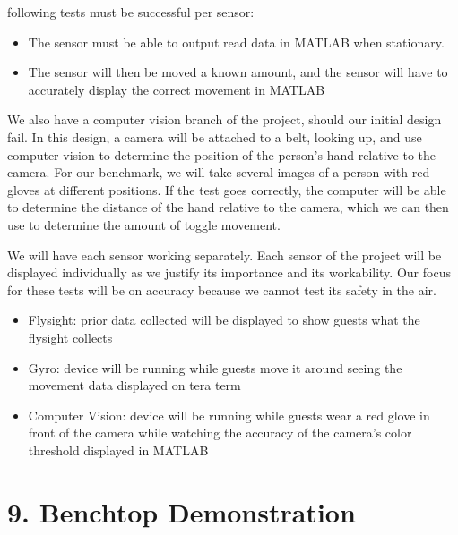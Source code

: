 \documentclass[10pt]{article}
\begin{document}
following tests must be successful per sensor:

\begin{itemize}

\item The sensor must be able to output read data in MATLAB when stationary.

\item The sensor will then be moved a known amount, and the sensor will have to accurately display the correct movement in MATLAB
\end{itemize}

We also have a computer vision branch of the project, should our initial design fail. In this design, a camera will be attached to a belt, looking up, and use computer vision to determine the position of the person’s hand relative to the camera. For our benchmark, we will take several images of a person with red gloves at different positions. If the test goes correctly, the computer will be able to determine the distance of the hand relative to the camera, which we can then use to determine the amount of toggle movement.



We will have each sensor working separately. Each sensor of the project will be displayed individually as we justify its importance and its workability. Our focus for these tests will be on accuracy because we cannot test its safety in the air.

\begin{itemize}

\item Flysight: prior data collected will be displayed to show guests what the flysight collects

\item Gyro: device will be running while guests move it around seeing the movement data displayed on tera term

\item Computer Vision: device will be running while guests wear a red glove in front of the camera while watching the accuracy of the camera’s color threshold displayed in MATLAB
\end{itemize}










\section{9. Benchtop Demonstration}
\end{document}
